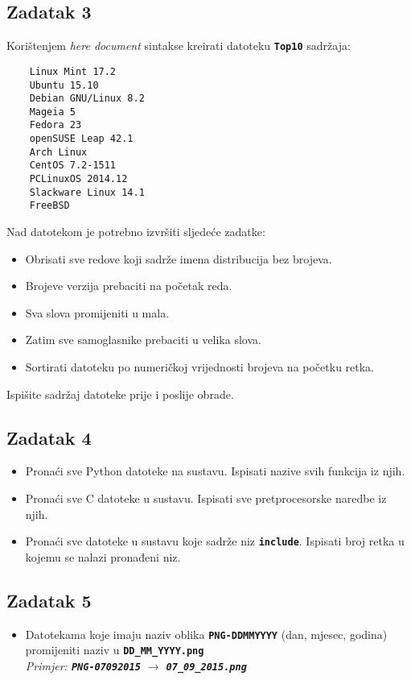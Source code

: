 \documentclass[12pt,a4paper]{article}
\newcommand{\shell}[1]{\texttt{\textbf{#1}}}
\begin{document}
	\subsection*{Zadatak 3}
	Korištenjem \textit{here document} sintakse kreirati datoteku \shell{Top10} sadržaja:
	\begin{verbatim}
	Linux Mint 17.2
	Ubuntu 15.10
	Debian GNU/Linux 8.2
	Mageia 5
	Fedora 23
	openSUSE Leap 42.1
	Arch Linux
	CentOS 7.2-1511
	PCLinuxOS 2014.12
	Slackware Linux 14.1
	FreeBSD
	\end{verbatim}
	Nad datotekom je potrebno izvršiti sljedeće zadatke:
	\begin{itemize}
		\item Obrisati sve redove koji sadrže imena distribucija bez brojeva.
		\item Brojeve verzija prebaciti na početak reda.
		\item Sva slova promijeniti u mala.
		\item Zatim sve samoglasnike prebaciti u velika slova.
		\item Sortirati datoteku po numeričkoj vrijednosti brojeva na početku retka.
	\end{itemize}
	Ispišite sadržaj datoteke prije i poslije obrade.

	\subsection*{Zadatak 4}
	\begin{itemize}
		\item Pronaći sve Python datoteke na sustavu. Ispisati nazive svih funkcija iz njih.
		\item Pronaći sve C datoteke u sustavu. Ispisati sve pretprocesorske naredbe iz njih.
		\item Pronaći sve datoteke u sustavu koje sadrže niz \shell{include}. Ispisati broj retka u kojemu se nalazi pronađeni niz.
	\end{itemize}

	\subsection*{Zadatak 5}
	\begin{itemize}
    \item Datotekama koje imaju naziv oblika \shell{PNG-DDMMYYYY} (dan, mjesec, godina) promijeniti naziv u \shell{DD\_MM\_YYYY.png} \\ \textit{Primjer: \shell{PNG-07092015} $\longrightarrow$ \shell{07\_09\_2015.png}}
	\end{itemize}
\end{document}
